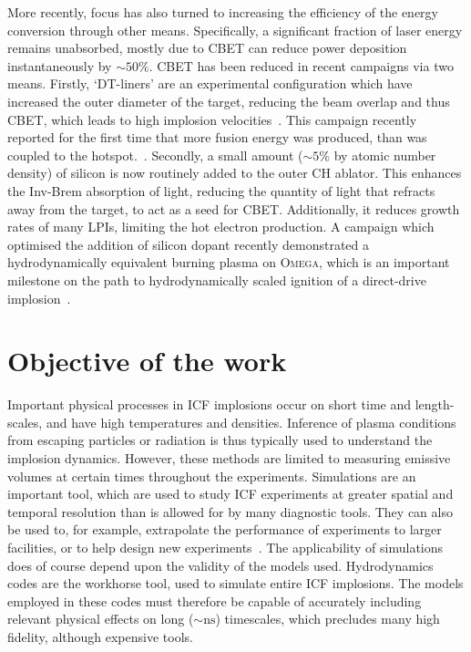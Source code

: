 More recently, focus has also turned to increasing the efficiency of the energy conversion through other means.
Specifically, a significant fraction of laser energy remains unabsorbed, mostly due to \ac{CBET} can reduce power deposition instantaneously by $\sim50\%$.
\ac{CBET} has been reduced in recent campaigns via two means.
Firstly, `DT-liners' are an experimental configuration which have increased the outer diameter of the target, reducing the beam overlap and thus \ac{CBET}, which leads to high implosion velocities~\cite{williams_high_2021}.
This campaign recently reported for the first time that more fusion energy was produced, than was coupled to the hotspot.~\cite{williams_demonstration_2024}.
Secondly, a small amount ($\sim5\%$ by atomic number density) of silicon is now routinely added to the outer CH ablator.
This enhances the \ac{Inv-Brem} absorption of light, reducing the quantity of light that refracts away from the target, to act as a seed for \ac{CBET}.
Additionally, it reduces growth rates of many \ac{LPIs}, limiting the hot electron production.
A campaign which optimised the addition of silicon dopant recently demonstrated a hydrodynamically equivalent burning plasma on \textsc{Omega}, which is an important milestone on the path to hydrodynamically scaled ignition of a direct-drive implosion~\cite{gopalaswamy_demonstration_2024}.

\section{Objective of the work}%
\label{sec:intro_objective}

Important physical processes in \ac{ICF} implosions occur on short time and length-scales, and have high temperatures and densities.
Inference of plasma conditions from escaping particles or radiation is thus typically used to understand the implosion dynamics.
However, these methods are limited to measuring emissive volumes at certain times throughout the experiments.
Simulations are an important tool, which are used to study \ac{ICF} experiments at greater spatial and temporal resolution than is allowed for by many diagnostic tools.
They can also be used to, for example, extrapolate the performance of experiments to larger facilities, or to help design new experiments~\cite{kritcher_design_2022}.
The applicability of simulations does of course depend upon the validity of the models used.
Hydrodynamics codes are the workhorse tool, used to simulate entire \ac{ICF} implosions.
The models employed in these codes must therefore be capable of accurately including relevant physical effects on long ($\sim\text{ns}$) timescales, which precludes many high fidelity, although expensive tools.

